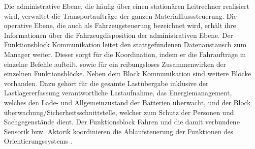 \begin{itemize}
Die administrative Ebene, die h\"aufig \"uber einen station\"aren Leitrechner realisiert wird, verwaltet die Transportauftr\"age der ganzen Materialflusssteuerung. Die operative Ebene, die auch als Fahrzeugsteuerung bezeichnet wird, erh\"alt ihre Informationen \"uber die Fahrzeugdisposition der administrativen Ebene. Der Funktionsblock Kommunikation leitet den stattgefundenen Datenaustausch zum Manager weiter. Dieser sorgt f\"ur die Koordination, indem er die Fahrauftr\"age in einzelne Befehle aufteilt, sowie f\"ur ein reibungsloses Zusammenwirken der einzelnen Funktionsbl\"ocke. Neben dem Block Kommunikation sind weitere Bl\"ocke vorhanden. Dazu geh\"ort f\"ur die gesamte Last\"ubergabe inklusive der Lastlagererfassung verantwortliche Lastaufnahme, das Energiemanagement, welches den Lade- und Allgemeinzustand der Batterien \"uberwacht, und der Block \"uberwachung/Sicherheitsschnittstelle, welcher zum Schutz der Personen und Sachgegenst\"ande dient. Der Funktionsblock Fahren und die damit verbundene Sensorik bzw. Aktorik koordinieren die Ablaufsteuerung der Funktionen des Orientierungssystems \cite[S. 33]{Langenbach:2012}.


\end{itemize}

